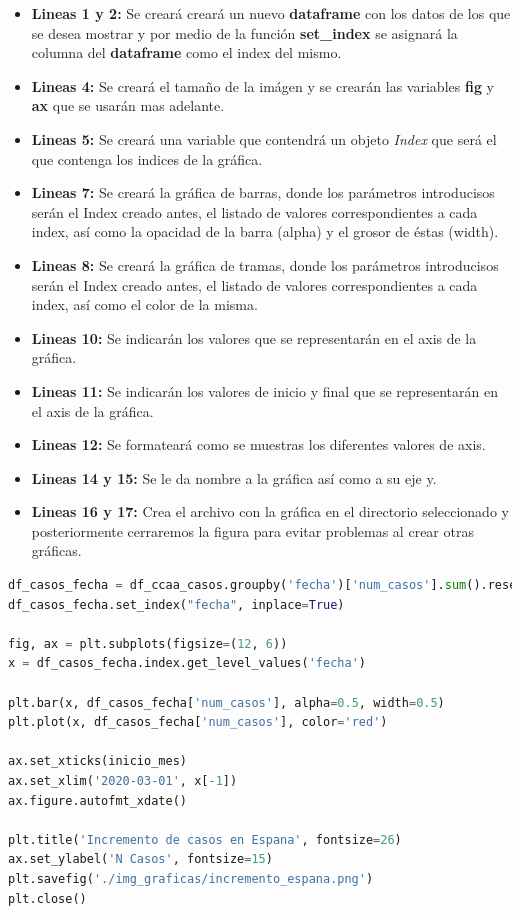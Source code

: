 \begin{itemize}
	\item \textbf{Lineas 1 y 2:} Se creará creará un nuevo \textbf{dataframe} con los datos de los que se desea mostrar y por medio de la función \textbf{set\_index} se asignará la columna del \textbf{dataframe} como el index del mismo.
	\item \textbf{Lineas 4:} Se creará el tamaño de la imágen y se crearán las variables \textbf{fig} y \textbf{ax} que se usarán mas adelante.
	\item \textbf{Lineas 5:} Se creará una variable que contendrá un objeto \textit{Index} que será el que contenga los indices de la gráfica.
	\item \textbf{Lineas 7:} Se creará la gráfica de barras, donde los parámetros introducisos serán el Index creado antes, el listado de valores correspondientes a cada index, así como la opacidad de la barra (alpha) y el grosor de éstas (width).
	\item \textbf{Lineas 8:} Se creará la gráfica de tramas, donde los parámetros introducisos serán el Index creado antes, el listado de valores correspondientes a cada index, así como el color de la misma.
	\item \textbf{Lineas 10:} Se indicarán los valores que se representarán en el axis de la gráfica.
	\item \textbf{Lineas 11:} Se indicarán los valores de inicio y final que se representarán en el axis de la gráfica.
	\item \textbf{Lineas 12:} Se formateará como se muestras los diferentes valores de axis.
	\item \textbf{Lineas 14 y 15:} Se le da nombre a la gráfica así como a su eje y.
	\item \textbf{Lineas 16 y 17:} Crea el archivo con la gráfica en el directorio seleccionado y posteriormente cerraremos la figura para evitar problemas al crear otras gráficas.
\end{itemize}

\begin{lstlisting}[language=Python, caption={Generár gráficos de barras y tramas.}, label={lst:barras}]
df_casos_fecha = df_ccaa_casos.groupby('fecha')['num_casos'].sum().reset_index()
df_casos_fecha.set_index("fecha", inplace=True)

fig, ax = plt.subplots(figsize=(12, 6))
x = df_casos_fecha.index.get_level_values('fecha')

plt.bar(x, df_casos_fecha['num_casos'], alpha=0.5, width=0.5)
plt.plot(x, df_casos_fecha['num_casos'], color='red')

ax.set_xticks(inicio_mes)
ax.set_xlim('2020-03-01', x[-1])
ax.figure.autofmt_xdate()

plt.title('Incremento de casos en Espana', fontsize=26)
ax.set_ylabel('N Casos', fontsize=15)
plt.savefig('./img_graficas/incremento_espana.png')
plt.close()
\end{lstlisting}

